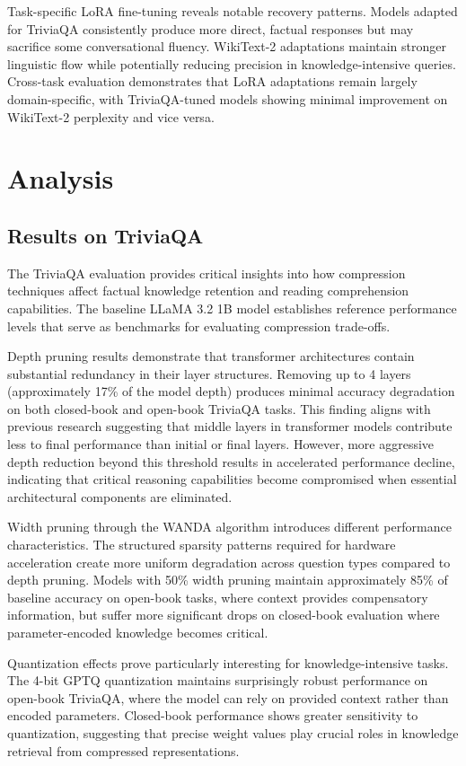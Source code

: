 Task-specific LoRA fine-tuning reveals notable recovery patterns. Models adapted for TriviaQA consistently produce more direct, factual responses but may sacrifice some conversational fluency. WikiText-2 adaptations maintain stronger linguistic flow while potentially reducing precision in knowledge-intensive queries. Cross-task evaluation demonstrates that LoRA adaptations remain largely domain-specific, with TriviaQA-tuned models showing minimal improvement on WikiText-2 perplexity and vice versa.

\section{Analysis}

\subsection{Results on TriviaQA}

The TriviaQA evaluation provides critical insights into how compression techniques affect factual knowledge retention and reading comprehension capabilities. The baseline LLaMA 3.2 1B model establishes reference performance levels that serve as benchmarks for evaluating compression trade-offs.

Depth pruning results demonstrate that transformer architectures contain substantial redundancy in their layer structures. Removing up to 4 layers (approximately 17\% of the model depth) produces minimal accuracy degradation on both closed-book and open-book TriviaQA tasks. This finding aligns with previous research suggesting that middle layers in transformer models contribute less to final performance than initial or final layers. However, more aggressive depth reduction beyond this threshold results in accelerated performance decline, indicating that critical reasoning capabilities become compromised when essential architectural components are eliminated.

Width pruning through the WANDA algorithm introduces different performance characteristics. The structured sparsity patterns required for hardware acceleration create more uniform degradation across question types compared to depth pruning. Models with 50\% width pruning maintain approximately 85\% of baseline accuracy on open-book tasks, where context provides compensatory information, but suffer more significant drops on closed-book evaluation where parameter-encoded knowledge becomes critical.

Quantization effects prove particularly interesting for knowledge-intensive tasks. The 4-bit GPTQ quantization maintains surprisingly robust performance on open-book TriviaQA, where the model can rely on provided context rather than encoded parameters. Closed-book performance shows greater sensitivity to quantization, suggesting that precise weight values play crucial roles in knowledge retrieval from compressed representations.

